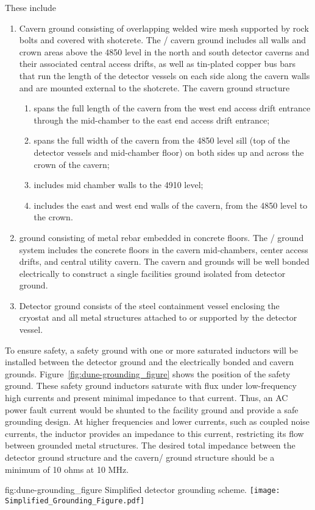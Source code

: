 These include
\begin{enumerate}
 \item Cavern ground consisting of overlapping welded wire mesh
   supported by rock bolts and covered with shotcrete. The
   / cavern ground includes all walls and
   crown areas above the 4850 level in the north and south detector
   caverns and their associated central access drifts, as well as tin-plated
   copper bus bars that run the length of the detector vessels
   on each side along the cavern walls and are mounted external to the
   shotcrete.  The cavern ground structure
\begin{enumerate}
 \item spans the full length of the cavern from the west end access
   drift entrance through the mid-chamber to the east end access drift
   entrance;
 \item spans the full width of the cavern from the 4850 level sill
   (top of the detector vessels and mid-chamber floor) on both sides
   up and across the crown of the cavern;
 \item includes mid chamber walls to the 4910 level;
 \item includes the east and west end walls of the cavern, from the
   4850 level to the crown.
\end{enumerate}
 \item {} ground consisting of metal rebar embedded in concrete floors. The /  ground system
   includes the concrete floors in the cavern mid-chambers, center
   access drifts, and central utility cavern. The cavern and  
   grounds will be well bonded electrically to construct a single
   facilities ground isolated from detector ground.
 \item Detector ground consists of the steel containment vessel
   enclosing the cryostat and all metal structures attached to or
   supported by the detector vessel.
\end{enumerate}


To ensure safety, a safety ground with one or more
saturated inductors will be installed between the detector ground
and the electrically bonded   and cavern grounds.
Figure~\ref{fig:dune-grounding_figure} shows the position of the safety ground. These safety ground inductors saturate with flux
under low-frequency high currents and present minimal impedance to
that current.  Thus, an AC power fault current would be shunted to the
facility ground and provide a safe grounding design. At higher
frequencies and lower currents, such as coupled noise currents, the
inductor provides an impedance to this current, restricting its
flow between grounded metal structures. The desired total impedance
between the detector ground structure and the cavern/ ground
structure should be a minimum of 10 ohms at 10 MHz.
\begin{dunefigure}{fig:dune-grounding_figure}
  {Simplified detector grounding scheme.}
  \texttt{[image: Simplified\_Grounding\_Figure.pdf]}
\end{dunefigure}


